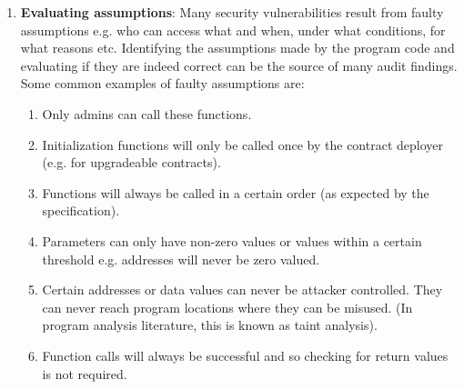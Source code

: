 \begin{enumerate}
\item\textbf{Evaluating assumptions}: Many security vulnerabilities result from faulty assumptions e.g. who can access what and when, under what conditions, for what reasons etc. Identifying the assumptions made by the program code and evaluating if they are indeed correct can be the source of many audit findings. Some common examples of faulty assumptions are:
	\begin{enumerate}
	\item Only admins can call these functions.
	\item Initialization functions will only be called once by the contract deployer (e.g. for upgradeable contracts).
	\item Functions will always be called in a certain order (as expected by the specification).
	\item Parameters can only have non-zero values or values within a certain threshold e.g. addresses will never be zero valued.
	\item Certain addresses or data values can never be attacker controlled. They can never reach program locations where they can be misused. (In program analysis literature, this is known as taint analysis).
	\item Function calls will always be successful and so checking for return values is not required.
	\end{enumerate}


\end{enumerate}

